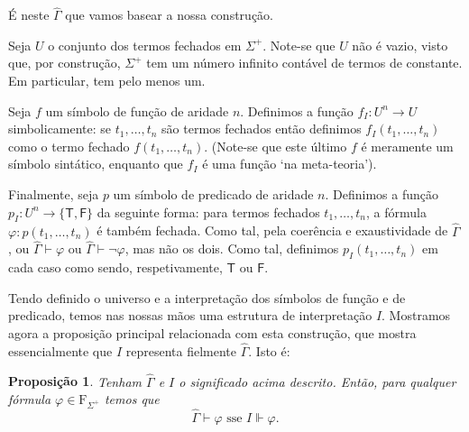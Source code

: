 \documentclass{report}
\newtheorem{prop}{Proposição}
\theoremstyle{definition}
\theoremstyle{remark}
\newcommand{\F}{\mathrm{F}}
\newcommand{\lt}{\mathsf{T}}
\newcommand{\lf}{\mathsf{F}}
\begin{document}
	É neste $\widehat\Gamma$ que vamos basear a nossa construção.
	
	Seja $U$ o conjunto dos termos fechados em $\Sigma^+$. Note-se que $U$ não é vazio, visto que, por construção, $\Sigma^+$ tem um número infinito contável de termos de constante. Em particular, tem pelo menos um.
	
	Seja $f$ um símbolo de função de aridade $n$. Definimos a função $f_I : U^n \to U$ simbolicamente: se $t_1, \dots, t_n$ são termos fechados então definimos $f_I(t_1, \dots, t_n)$ como o termo fechado $f(t_1, \dots, t_n)$. (Note-se que este último $f$ é meramente um símbolo sintático, enquanto que $f_I$ é uma função `na meta-teoria').
	
	Finalmente, seja $p$ um símbolo de predicado de aridade $n$. Definimos a função $p_I : U^n \to \{\lt, \lf\}$ da seguinte forma: para termos fechados $t_1, \dots, t_n$, a fórmula $\varphi : p(t_1, \dots, t_n)$ é também fechada. Como tal, pela coerência e exaustividade de $\widehat\Gamma$, ou $\widehat\Gamma \vdash \varphi$ ou $\widehat\Gamma \vdash \neg\varphi$, mas não os dois. Como tal, definimos $p_I(t_1, \dots, t_n)$ em cada caso como sendo, respetivamente, $\lt$ ou $\lf$.
	
	Tendo definido o universo e a interpretação dos símbolos de função e de predicado, temos nas nossas mãos uma estrutura de interpretação $I$. Mostramos agora a proposição principal relacionada com esta construção, que mostra essencialmente que $I$ representa fielmente $\widehat\Gamma$. Isto é:
	
	\begin{prop}\label{prop:gammahatsemantics}
	Tenham $\widehat\Gamma$ e $I$ o significado acima descrito. Então, para qualquer fórmula $\varphi \in \F_{\Sigma^+}$ temos que
	\begin{equation}\label{gammahatsemantics}
	\widehat\Gamma \vdash \varphi \text{ sse } I \Vdash \varphi.
	\end{equation}
	\end{prop}
	
\end{document}
